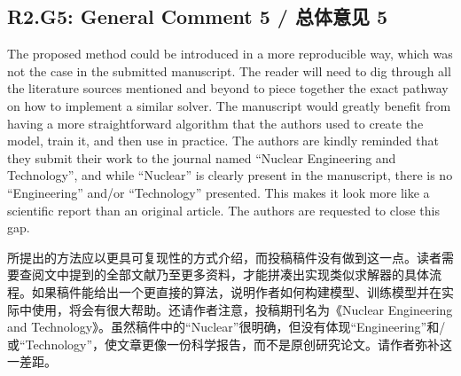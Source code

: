 \documentclass[11pt,a4paper,twoside]{article}
\begin{document}
\subsection{R2.G5: General Comment 5 / 总体意见 5}
\begin{englishcomment}
The proposed method could be introduced in a more reproducible way, which was not the case in the submitted manuscript. The reader will need to dig through all the literature sources mentioned and beyond to piece together the exact pathway on how to implement a similar solver. The manuscript would greatly benefit from having a more straightforward algorithm that the authors used to create the model, train it, and then use in practice. The authors are kindly reminded that they submit their work to the journal named ``Nuclear Engineering and Technology'', and while ``Nuclear'' is clearly present in the manuscript, there is no ``Engineering'' and/or ``Technology'' presented. This makes it look more like a scientific report than an original article. The authors are requested to close this gap.
\end{englishcomment}
\begin{chinesecomment}
所提出的方法应以更具可复现性的方式介绍，而投稿稿件没有做到这一点。读者需要查阅文中提到的全部文献乃至更多资料，才能拼凑出实现类似求解器的具体流程。如果稿件能给出一个更直接的算法，说明作者如何构建模型、训练模型并在实际中使用，将会有很大帮助。还请作者注意，投稿期刊名为《Nuclear Engineering and Technology》。虽然稿件中的“Nuclear”很明确，但没有体现“Engineering”和/或“Technology”，使文章更像一份科学报告，而不是原创研究论文。请作者弥补这一差距。
\end{chinesecomment}
\begin{revisionidea}
\end{revisionidea}

\end{document}
